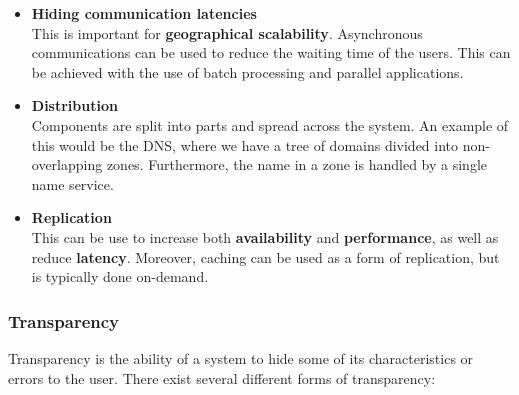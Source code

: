 \documentclass{article}
\begin{document}
\begin{itemize}
	\item \textbf{Hiding communication latencies} \\
	This is important for \textbf{geographical scalability}. Asynchronous communications can be used to reduce the waiting time of the users. This can be achieved with the use of batch processing and parallel applications.
	
	\item \textbf{Distribution} \\
	Components are split into parts and spread across the system. An example of this would be the DNS, where we have a tree of domains divided into non-overlapping zones. Furthermore, the name in a zone is handled by a single name service.
	
	\item \textbf{Replication} \\
	This can be use to increase both \textbf{availability} and \textbf{performance}, as well as reduce \textbf{latency}. Moreover, caching can be used as a form of replication, but is typically done on-demand.
\end{itemize}

\subsubsection{Transparency}
Transparency is the ability of a system to hide some of its characteristics or errors to the user. There exist several different forms of transparency:
\end{document}
